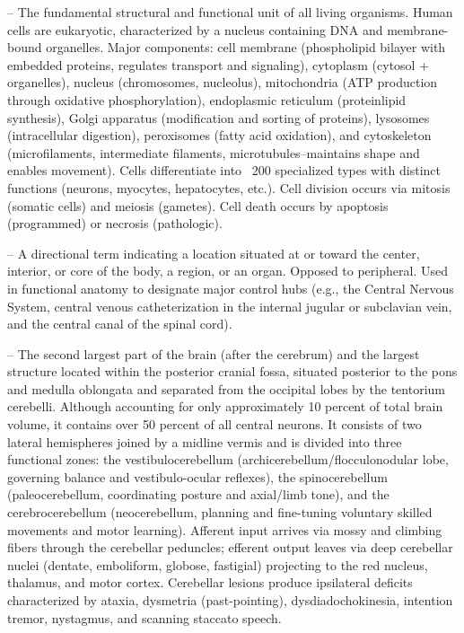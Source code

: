 -- The fundamental structural and functional unit of all living organisms. Human cells are eukaryotic, characterized by a nucleus containing DNA and membrane-bound organelles. Major components: cell membrane (phospholipid bilayer with embedded proteins, regulates transport and signaling), cytoplasm (cytosol + organelles), nucleus (chromosomes, nucleolus), mitochondria (ATP production through oxidative phosphorylation), endoplasmic reticulum (protein\/lipid synthesis), Golgi apparatus (modification and sorting of proteins), lysosomes (intracellular digestion), peroxisomes (fatty acid oxidation), and cytoskeleton (microfilaments, intermediate filaments, microtubules--maintains shape and enables movement). Cells differentiate into ~200 specialized types with distinct functions (neurons, myocytes, hepatocytes, etc.). Cell division occurs via mitosis (somatic cells) and meiosis (gametes). Cell death occurs by apoptosis (programmed) or necrosis (pathologic).

-- A directional term indicating a location situated at or toward the center, interior, or core of the body, a region, or an organ. Opposed to peripheral. Used in functional anatomy to designate major control hubs (e.g., the Central Nervous System, central venous catheterization in the internal jugular or subclavian vein, and the central canal of the spinal cord).

-- The second largest part of the brain (after the cerebrum) and the largest structure located within the posterior cranial fossa, situated posterior to the pons and medulla oblongata and separated from the occipital lobes by the tentorium cerebelli. Although accounting for only approximately 10 percent of total brain volume, it contains over 50 percent of all central neurons. It consists of two lateral hemispheres joined by a midline vermis and is divided into three functional zones: the vestibulocerebellum (archicerebellum/flocculonodular lobe, governing balance and vestibulo-ocular reflexes), the spinocerebellum (paleocerebellum, coordinating posture and axial/limb tone), and the cerebrocerebellum (neocerebellum, planning and fine-tuning voluntary skilled movements and motor learning). Afferent input arrives via mossy and climbing fibers through the cerebellar peduncles; efferent output leaves via deep cerebellar nuclei (dentate, emboliform, globose, fastigial) projecting to the red nucleus, thalamus, and motor cortex. Cerebellar lesions produce ipsilateral deficits characterized by ataxia, dysmetria (past-pointing), dysdiadochokinesia, intention tremor, nystagmus, and scanning staccato speech.


